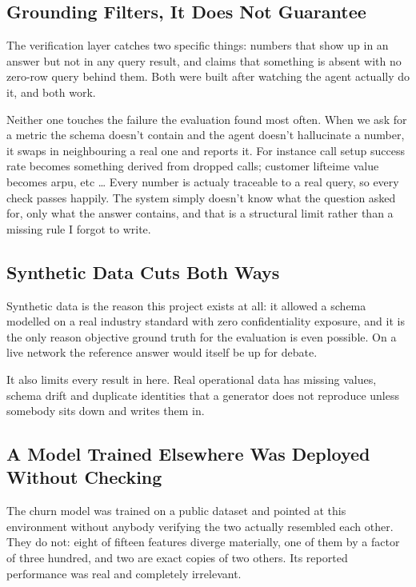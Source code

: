 \subsection{Grounding Filters, It Does Not Guarantee}

The verification layer catches two specific things: numbers that show up in an
answer but not in any query result, and claims that something is absent with no
zero-row query behind them. Both were built after watching the agent actually do
it, and both work.

Neither one touches the failure the evaluation found most often. When we ask for a 
metric the schema doesn't contain and the agent doesn't hallucinate a number, it 
swaps in neighbouring a real one and reports it. For instance call setup success rate 
becomes something derived from dropped calls; customer lifteime value becomes arpu, etc \dots
Every number is actualy traceable to a real query, so every check passes happily.
The system simply doesn't know what the question
asked for, only what the answer contains, and that is a structural limit rather
than a missing rule I forgot to write.


\subsection{Synthetic Data Cuts Both Ways}

Synthetic data is the reason this project exists at all: it allowed a schema
modelled on a real industry standard with zero confidentiality exposure, and it
is the only reason objective ground truth for the evaluation is even possible.
On a live network the reference answer would itself be up for debate.

It also limits every result in here. Real operational data has missing values,
schema drift and duplicate identities that a generator does not reproduce unless
somebody sits down and writes them in. 

\subsection{A Model Trained Elsewhere Was Deployed Without Checking}

The churn model was trained on a public dataset and pointed at this environment
without anybody verifying the two actually resembled each other. They do not:
eight of fifteen features diverge materially, one of them by a factor of three
hundred, and two are exact copies of two others. Its reported performance was
real and completely irrelevant.

